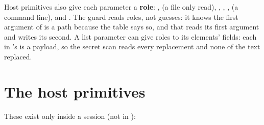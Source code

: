 Host primitives also give each parameter a \textbf{role}: ,
 (a file only read), , ,
,  (a command line),  and
. The guard reads roles, not guesses: it knows the first
argument of  is a path because the table says so, and that
 reads its first argument and writes its second. A list
parameter can give roles to its elements' fields: each  in
's  is a payload, so the secret scan reads every
replacement and none of the text replaced.

\section{The host primitives}

These exist only inside a session (not in ):

